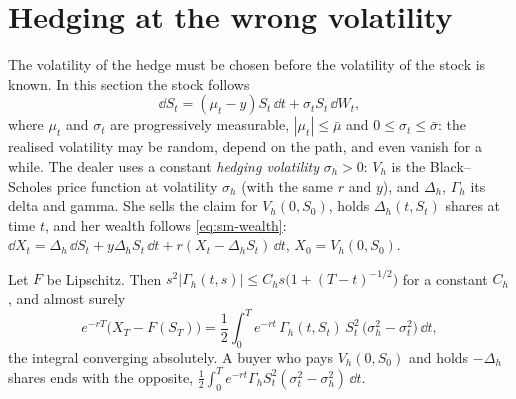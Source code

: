 
\section{Hedging at the wrong volatility}\label{sec:hd-wrong-vol}

The volatility of the hedge must be chosen before the volatility of the stock is known. In
this section the stock follows
\[
  \dd S_t=(\mu_t-y)S_t\,\dd t+\sigma_tS_t\,\dd W_t ,
\]
where $\mu_t$ and $\sigma_t$ are progressively measurable, $|\mu_t|\le\bar\mu$ and
$0\le\sigma_t\le\bar\sigma$: the realised volatility may be random, depend on the path, and even
vanish for a while. The dealer uses a constant \emph{hedging volatility} $\sigma_h>0$: $V_h$ is the
Black--Scholes price function at volatility $\sigma_h$ (with the same $r$ and $y$), and
$\Delta_h$, $\Gamma_h$ its delta and gamma. She sells the claim for $V_h(0,S_0)$, holds
$\Delta_h(t,S_t)$ shares at time $t$, and her wealth follows \eqref{eq:sm-wealth}:
$\dd X_t=\Delta_h\,\dd S_t+y\Delta_hS_t\,\dd t+r(X_t-\Delta_hS_t)\,\dd t$, $X_0=V_h(0,S_0)$.

\begin{proposition}\label{prop:hd-wrong-vol}
Let $F$ be Lipschitz. Then $s^2|\Gamma_h(t,s)|\le C_hs\big(1+(T-t)^{-1/2}\big)$ for a constant
$C_h$, and almost surely
\begin{equation}\label{eq:hd-wrong-vol}
  e^{-rT}\big(X_T-F(S_T)\big)=\frac12\int_0^Te^{-rt}\,\Gamma_h(t,S_t)\,S_t^2\,\big(\sigma_h^2-\sigma_t^2\big)\,\dd t,
\end{equation}
the integral converging absolutely. A buyer who pays $V_h(0,S_0)$ and holds $-\Delta_h$ shares ends
with the opposite, $\frac12\int_0^Te^{-rt}\Gamma_hS_t^2(\sigma_t^2-\sigma_h^2)\,\dd t$.
\end{proposition}


